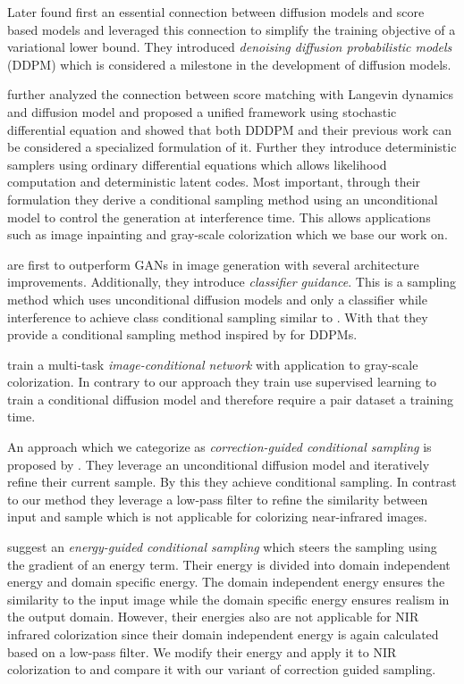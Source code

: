 Later \textcite{ddpm} found first an essential connection between diffusion models and score based models and leveraged this connection to simplify the training objective of a variational lower bound.
They introduced \textit{denoising diffusion probabilistic models} (DDPM) which is considered a milestone in the development of diffusion models.

\textcite{sbgm} further analyzed the connection between score matching with Langevin dynamics and diffusion model and proposed a unified framework using stochastic differential equation
and showed that both DDDPM \parencite{ddpm} and their previous work \parencite{generative-modeling-by-estimating-gradients-of-the-data-distribution} can be considered a specialized formulation of it.
Further they introduce deterministic samplers using ordinary differential equations which allows likelihood computation and deterministic latent codes. 
Most important, through their formulation they derive a conditional sampling method using an unconditional model to control the generation at interference time. 
This allows applications such as image inpainting and gray-scale colorization which we base our work on. 

\textcite{diffusion-beats-gans} are first to outperform GANs in image generation with several architecture improvements.
Additionally, they introduce \textit{classifier guidance}.
This is a sampling method which uses unconditional diffusion models and only a classifier while interference to achieve class conditional sampling similar to \textcite{sbgm}.
With that they provide a conditional sampling method inspired by \textcite{sbgm} for DDPMs. 

\textcite{palette} train a multi-task \textit{image-conditional network} with application to gray-scale colorization. 
In contrary to our approach they train use supervised learning to train a conditional diffusion model and therefore require a pair dataset a training time.

An approach which we categorize as \textit{correction-guided conditional sampling} is proposed by \textcite{ilvr}.
They leverage an unconditional diffusion model and iteratively refine their current sample. 
By this they achieve conditional sampling. 
In contrast to our method they leverage a low-pass filter to refine the similarity between input and sample which is not applicable for colorizing near-infrared images. 

\textcite{egsde} suggest an \textit{energy-guided conditional sampling} which steers the sampling using the gradient of an energy term.
Their energy is divided into domain independent energy and domain specific energy. 
The domain independent energy ensures the similarity to the input image while the domain specific energy ensures realism in the output domain. 
However, their energies also are not applicable for NIR infrared colorization since their domain independent energy is again calculated based on a low-pass filter. 
We modify their energy and apply it to NIR colorization to and compare it with our variant of correction guided sampling.

